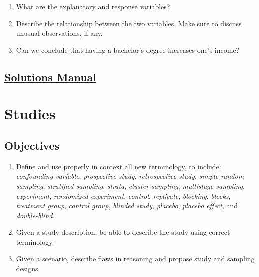 \documentclass[
  letterpaper,
  DIV=11,
  numbers=noendperiod]{scrreprt}
\begin{document}
\begin{enumerate}
\def\labelenumi{\alph{enumi}.}
\item
  What are the explanatory and response variables?
\item
  Describe the relationship between the two variables. Make sure to
  discuss unusual observations, if any.
\item
  Can we conclude that having a bachelor's degree increases one's
  income?
\end{enumerate}

\section*{\texorpdfstring{\href{https://ds-usafa.github.io/CPS-Solutions-Manual/ODCP.html}{Solutions
Manual}}{Solutions Manual}}\label{solutions-manual-3}


\chapter{Studies}\label{STUDY}

\section{Objectives}\label{objectives-4}

\begin{enumerate}
\def\labelenumi{\arabic{enumi})}
\item
  Define and use properly in context all new terminology, to include:
  \emph{confounding variable}, \emph{prospective study},
  \emph{retrospective study}, \emph{simple random sampling},
  \emph{stratified sampling}, \emph{strata}, \emph{cluster sampling},
  \emph{multistage sampling}, \emph{experiment}, \emph{randomized
  experiment}, \emph{control}, \emph{replicate}, \emph{blocking},
  \emph{blocks}, \emph{treatment group}, \emph{control group},
  \emph{blinded study}, \emph{placebo}, \emph{placebo effect}, and
  \emph{double-blind}.
\item
  Given a study description, be able to describe the study using correct
  terminology.
\item
  Given a scenario, describe flaws in reasoning and propose study and
  sampling designs.
\end{enumerate}
\end{document}
